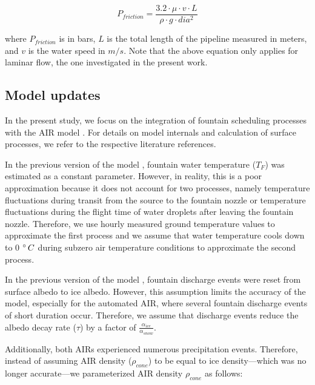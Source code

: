 \documentclass[tc, manuscript]{copernicus}
\begin{document}
\begin{equation}
  \label{eqn:friction}
  P_{friction} = \frac{3.2 \cdot \mu \cdot v \cdot L}{\rho \cdot g \cdot dia^2}
\end{equation}

where $P_{friction}$ is in bars, $L$ is the total length of the pipeline measured in meters, and $v$ is the water speed in
$m/s$. Note that the above equation only applies for laminar flow, the one investigated in the present work.


\subsection{Model updates}

In the present study, we focus on the
integration of fountain scheduling processes with the AIR model
\citep{balasubramanianInfluenceMeteorologicalConditions2022}. For details on model internals and 
calculation of surface processes, we refer to the respective literature references. 

In the previous version of the model \citep{balasubramanianInfluenceMeteorologicalConditions2022}, fountain
water temperature ($T_F$) was estimated as a constant parameter. However, in reality, this is a poor
approximation because it does not account for two processes, namely temperature fluctuations during transit
from the source to the fountain nozzle or temperature fluctuations during the flight time of water
droplets after leaving the fountain nozzle. Therefore, we use hourly measured ground temperature
values to approximate the first process and we assume that water temperature cools down to 0 $^{\circ}\,C$ during subzero
air temperature conditions to approximate the second process.

In the previous version of the model \citep{balasubramanianInfluenceMeteorologicalConditions2022}, fountain
discharge events were reset from surface albedo to ice albedo. However, this assumption limits the accuracy of
the model, especially for the automated AIR, where several fountain discharge events of short duration occur.
Therefore, we assume that discharge events reduce the albedo decay rate ($\tau$) by a 
factor of $\frac{\alpha_{ice}}{\alpha_{snow}}$.

Additionally, both AIRs experienced numerous precipitation events. Therefore, instead of 
assuming AIR density ($\rho_{cone}$) to be equal to ice density---which was no longer accurate---we parameterized AIR density $\rho_{cone}$ as follows:
\end{document}
